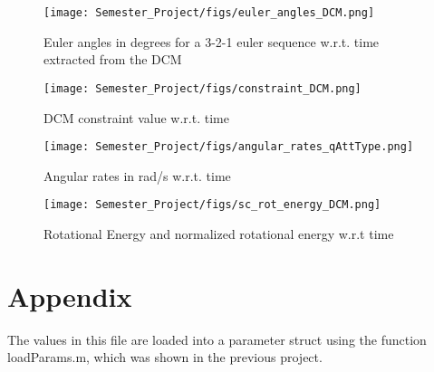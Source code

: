 \documentclass[12pt]{article}
\begin{document}
\begin{figure}[H]
\centering
    \texttt{[image: Semester\_Project/figs/euler\_angles\_DCM.png]}
    \caption{Euler angles in degrees for a 3-2-1 euler sequence w.r.t. time extracted from the DCM}
\end{figure}
\begin{figure}[H]
\centering
    \texttt{[image: Semester\_Project/figs/constraint\_DCM.png]}
    \caption{DCM constraint value w.r.t. time}
\end{figure}
\begin{figure}[H]
\centering
    \texttt{[image: Semester\_Project/figs/angular\_rates\_qAttType.png]}
    \caption{Angular rates in rad/s w.r.t. time}
\end{figure}
\begin{figure}[H]
\centering
    \texttt{[image: Semester\_Project/figs/sc\_rot\_energy\_DCM.png]}
    \caption{Rotational Energy and normalized rotational energy w.r.t time}
\end{figure}


\section{Appendix}

The values in this file are loaded into a parameter struct using the function loadParams.m, which was shown in the previous project.




\end{document}

